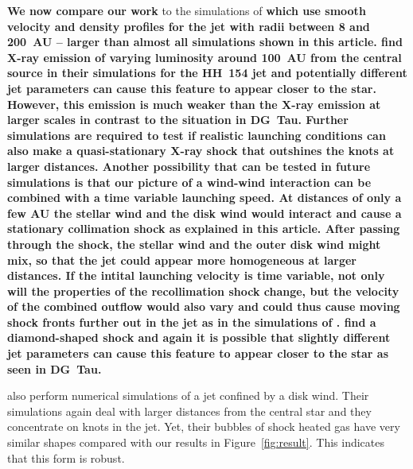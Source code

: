 \documentclass[manuscript]{aastex}
\begin{document}
\textbf{We now compare our work} to the simulations of \citet{2010A&A...511A..42B,2010A&A...517A..68B} \textbf{which use smooth velocity and density profiles for the jet with radii between 8 and 200~AU -- larger than almost all simulations shown in this article.  \citet{2010A&A...517A..68B} find X-ray emission of varying luminosity around 100~AU from the central source in their simulations for the HH~154 jet and potentially different jet parameters can cause this feature to appear closer to the star. However, this emission is much weaker than the X-ray emission at larger scales in contrast to the situation in DG~Tau. Further simulations are required to test if realistic launching conditions can also make a quasi-stationary X-ray shock that outshines the knots at larger distances. Another possibility that can be tested in future simulations is that our picture of a wind-wind interaction can be combined with a time variable launching speed. At distances of only a few AU the stellar wind and the disk wind would interact and cause a stationary collimation shock as explained in this article. After passing through the shock, the stellar wind and the outer disk wind might mix, so that the jet could appear more homogeneous at larger distances. If the intital launching velocity is time variable, not only will the properties of the recollimation shock change, but the velocity of the combined outflow would also vary and could thus cause moving shock fronts further out in the jet as in the simulations of \citet{2010A&A...511A..42B,2010A&A...517A..68B}.
\citet{2011ApJ...737...54B} find a diamond-shaped shock and again it is possible that slightly different jet parameters can cause this feature to appear closer to the star as seen in DG~Tau. }

\citet{2009A&A...502..217M,2012A&A...545A..53M} also perform numerical simulations of a jet confined by a disk wind. Their simulations again deal with larger distances from the central star and they concentrate on knots in the jet. Yet, their bubbles of shock heated gas have very similar shapes compared with our results in Figure~\ref{fig:result}. This indicates that this form is robust. 
\end{document}
